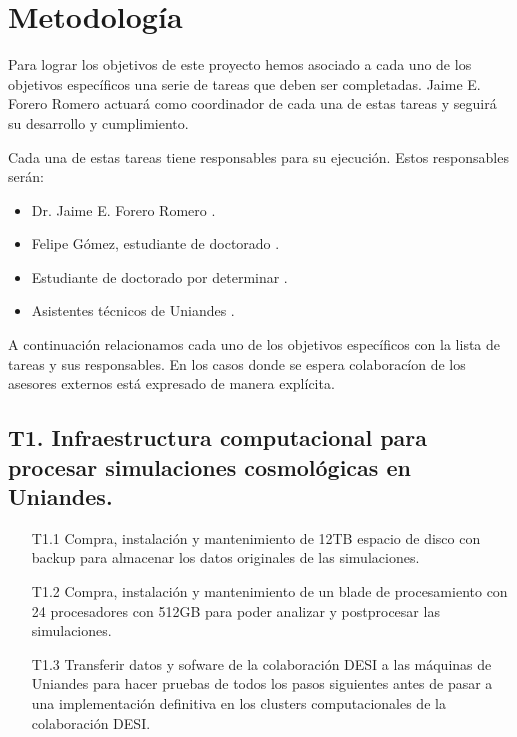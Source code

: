 
\section{Metodolog\'ia}
\label{metodologia}

Para lograr los objetivos de este proyecto hemos asociado a cada uno
de los objetivos espec\'ificos una serie de tareas que deben ser
completadas. Jaime E. Forero Romero actuar\'a como coordinador de cada
una de estas tareas y seguir\'a su desarrollo y cumplimiento. 

Cada una de estas tareas tiene responsables para su ejecuci\'on. Estos
responsables ser\'an:

\begin{itemize}
\item Dr. Jaime E. Forero Romero  \prof.
\item Felipe G\'omez, estudiante de doctorado \gradA.
\item Estudiante de doctorado por determinar \gradB.
\item Asistentes t\'ecnicos de Uniandes \tecn.
\end{itemize}


A continuaci\'on relacionamos cada uno de los objetivos espec\'ificos
con la lista de tareas y sus responsables. En los casos
donde se espera colaborac\'ion de los asesores externos est\'a
expresado de manera expl\'icita.

\subsection*{T1. Infraestructura computacional para procesar simulaciones cosmol\'ogicas en Uniandes.} 
\begin{itemize}
\item[T1.1] \tecn Compra, instalaci\'on y mantenimiento de 12TB espacio de disco
  con backup para almacenar los datos originales de las simulaciones.
\item[T1.2] \tecn Compra, instalaci\'on y mantenimiento de un blade de
  procesamiento con 24 procesadores con 512GB para poder analizar y
  postprocesar las simulaciones.
\item[T1.3] \tecn\prof Transferir datos y sofware de la colaboraci\'on
  DESI a las m\'aquinas de Uniandes para hacer pruebas de todos los
  pasos siguientes antes de pasar a una implementaci\'on definitiva en
  los clusters computacionales de la colaboraci\'on DESI. 
\end{itemize}

